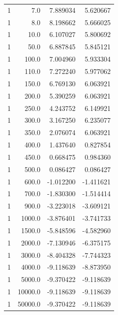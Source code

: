 \documentclass[12pt]{article}
\begin{document}
\begin{table}[h!]
\begin{tabular}{rrrr}
        1 &             7.0 &                 7.889034 &                 5.620667 \\
        1 &             8.0 &                 8.198662 &                 5.666025 \\
        1 &            10.0 &                 6.107027 &                 5.800692 \\
        1 &            50.0 &                 6.887845 &                 5.845121 \\
        1 &           100.0 &                 7.004960 &                 5.933304 \\
        1 &           110.0 &                 7.272240 &                 5.977062 \\
        1 &           150.0 &                 6.769130 &                 6.063921 \\
        1 &           200.0 &                 5.390259 &                 6.063921 \\
        1 &           250.0 &                 4.243752 &                 6.149921 \\
        1 &           300.0 &                 3.167250 &                 6.235077 \\
        1 &           350.0 &                 2.076074 &                 6.063921 \\
        1 &           400.0 &                 1.437640 &                 0.827854 \\
        1 &           450.0 &                 0.668475 &                 0.984360 \\
        1 &           500.0 &                 0.086427 &                 0.086427 \\
        1 &           600.0 &                -1.012200 &                -1.411621 \\
        1 &           700.0 &                -1.830300 &                -1.514414 \\
        1 &           900.0 &                -3.223018 &                -3.609121 \\
        1 &          1000.0 &                -3.876401 &                -3.741733 \\
        1 &          1500.0 &                -5.848596 &                -4.582960 \\
        1 &          2000.0 &                -7.130946 &                -6.375175 \\
        1 &          3000.0 &                -8.404328 &                -7.744323 \\
        1 &          4000.0 &                -9.118639 &                -8.873950 \\
        1 &          5000.0 &                -9.370422 &                -9.118639 \\
        1 &         10000.0 &                -9.118639 &                -9.118639 \\
        1 &         50000.0 &                -9.370422 &                -9.118639 \\
        \hline
    \end{tabular}
\end{table}
\end{document}
